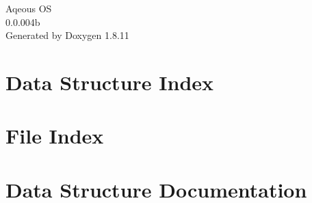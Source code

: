 \documentclass[twoside]{book}
\newcommand{\+}{\discretionary{\mbox{\scriptsize$\hookleftarrow$}}{}{}}
\newcommand{\clearemptydoublepage}{%
  \newpage{\pagestyle{empty}\cleardoublepage}%
}
\begin{document}
\hypersetup{pageanchor=false,
             bookmarksnumbered=true,
             pdfencoding=unicode
            }
\begin{titlepage}
\vspace*{7cm}
\begin{center}%
{\Large Aqeous OS \\[1ex]\large 0.\+0.\+004b }\\
\vspace*{1cm}
{\large Generated by Doxygen 1.8.11}\\
\end{center}
\end{titlepage}
\clearemptydoublepage
\tableofcontents
\clearemptydoublepage
{}
\hypersetup{pageanchor=true}

\chapter{Data Structure Index}

\chapter{File Index}

\chapter{Data Structure Documentation}
























































\end{document}
